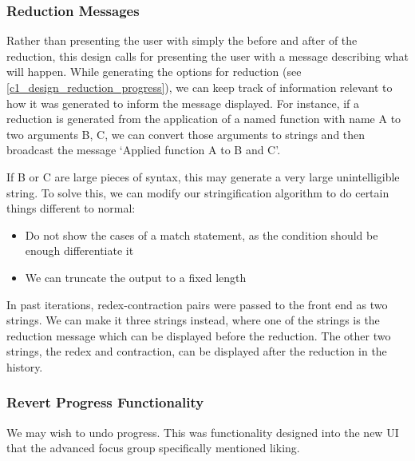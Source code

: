 
\subsubsection{Reduction Messages}
Rather than presenting the user with simply the before and after of the reduction, this design calls for presenting the user with a message describing what will happen. While generating the options for reduction (see \ref{c1_design_reduction_progress}), we can keep track of information relevant to how it was generated to inform the message displayed. For instance, if a reduction is generated from the application of a named function with name A to two arguments B, C, we can convert those arguments to strings and then broadcast the message `Applied function A to B and C'. 

If B or C are large pieces of syntax, this may generate a very large unintelligible string. To solve this, we can modify our stringification algorithm to do certain things different to normal:
\begin{itemize}
    \item Do not show the cases of a match statement, as the condition should be enough differentiate it
    \item We can truncate the output to a fixed length 
\end{itemize}

In past iterations, redex-contraction pairs were passed to the front end as two strings. We can make it three strings instead, where one of the strings is the reduction message which can be displayed before the reduction. The other two strings, the redex and contraction, can be displayed after the reduction in the history. 

\subsubsection{Revert Progress Functionality}
We may wish to undo progress. This was functionality designed into the new UI that the advanced focus group specifically mentioned liking. 

